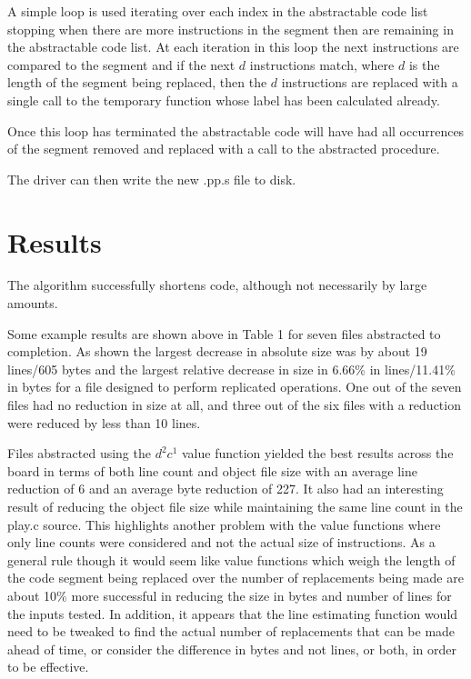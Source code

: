 \documentclass[9pt,nocopyrightspace]{sigplanconf}
\begin{document}
A simple loop is used iterating over each index in the abstractable code list stopping when there are more instructions in the segment then are remaining in the abstractable code list.
At each iteration in this loop the next instructions are compared to the segment and if the next $d$ instructions match, where $d$ is the length of the segment being replaced, then the $d$ instructions are replaced with a single call to the temporary function whose label has been calculated already.

Once this loop has terminated the abstractable code will have had all occurrences of the segment removed and replaced with a call to the abstracted procedure.

The driver can then write the new .pp.s file to disk.

\section{Results}

The algorithm successfully shortens code, although not necessarily by large amounts.

Some example results are shown above in Table 1 for seven files abstracted to completion.
As shown the largest decrease in absolute size was by about 19 lines/605 bytes and the largest relative decrease in size in 6.66\% in lines/11.41\% in bytes for a file designed to perform replicated operations.
One out of the seven files had no reduction in size at all, and three out of the six files with a reduction were reduced by less than 10 lines.

Files abstracted using the $d^{2}c^{1}$ value function yielded the best results across the board in terms of both line count and object file size with an average line reduction of 6 and an average byte reduction of 227.
It also had an interesting result of reducing the object file size while maintaining the same line count in the play.c source.
This highlights another problem with the value functions where only line counts were considered and not the actual size of instructions.
As a general rule though it would seem like value functions which weigh the length of the code segment being replaced over the number of replacements being made are about 10\% more successful in reducing the size in bytes and number of lines for the inputs tested.
In addition, it appears that the line estimating function would need to be tweaked to find the actual number of replacements that can be made ahead of time, or consider the difference in bytes and not lines, or both, in order to be effective.
\end{document}
